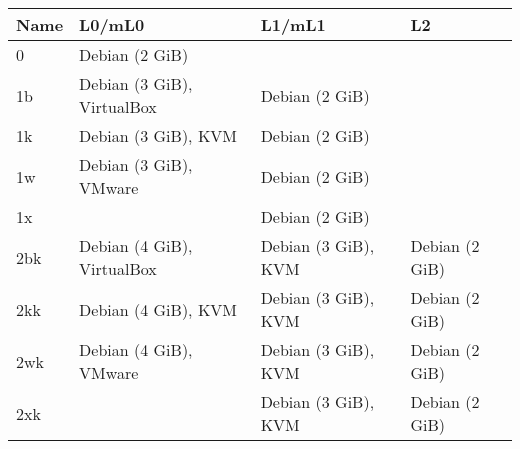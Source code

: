 \documentclass{standalone}
\begin{document}
%

\begin{tabular}{ l | l | l | l }\hline
Name & L0/mL0 & L1/mL1 & L2 \\ \hline
0 & Debian (2 GiB) &  &  \\
1b & Debian (3 GiB), VirtualBox & Debian (2 GiB) &  \\
1k & Debian (3 GiB), KVM & Debian (2 GiB) &  \\
1w & Debian (3 GiB), VMware & Debian (2 GiB) &  \\
1x & \XMHF64 & Debian (2 GiB) &  \\
2bk & Debian (4 GiB), VirtualBox & Debian (3 GiB), KVM & Debian (2 GiB) \\
2kk & Debian (4 GiB), KVM & Debian (3 GiB), KVM & Debian (2 GiB) \\
2wk & Debian (4 GiB), VMware & Debian (3 GiB), KVM & Debian (2 GiB) \\
2xk & \XMHF64 & Debian (3 GiB), KVM & Debian (2 GiB) \\
\end{tabular}
\end{document}
